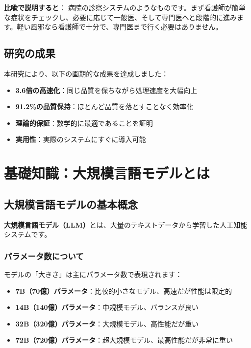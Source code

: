\documentclass[a4paper,12pt]{jsarticle}
\begin{document}
\textbf{比喩で説明すると}：
病院の診察システムのようなものです。まず看護師が簡単な症状をチェックし、必要に応じて一般医、そして専門医へと段階的に進みます。軽い風邪なら看護師で十分で、専門医まで行く必要はありません。

\subsection{研究の成果}

本研究により、以下の画期的な成果を達成しました：

\begin{itemize}
\item \textbf{3.6倍の高速化}：同じ品質を保ちながら処理速度を大幅向上
\item \textbf{91.2\%の品質保持}：ほとんど品質を落とすことなく効率化
\item \textbf{理論的保証}：数学的に最適であることを証明
\item \textbf{実用性}：実際のシステムにすぐに導入可能
\end{itemize}

\section{基礎知識：大規模言語モデルとは}

\subsection{大規模言語モデルの基本概念}

\textbf{大規模言語モデル（LLM）}とは、大量のテキストデータから学習した人工知能システムです。

\subsubsection{パラメータ数について}
モデルの「大きさ」は主にパラメータ数で表現されます：

\begin{itemize}
\item \textbf{7B（70億）パラメータ}：比較的小さなモデル、高速だが性能は限定的
\item \textbf{14B（140億）パラメータ}：中規模モデル、バランスが良い
\item \textbf{32B（320億）パラメータ}：大規模モデル、高性能だが重い
\item \textbf{72B（720億）パラメータ}：超大規模モデル、最高性能だが非常に重い
\end{itemize}
\end{document}
